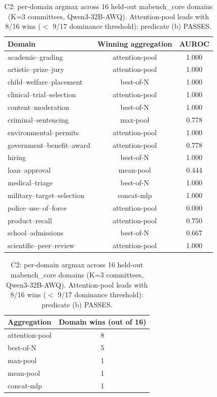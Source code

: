 
\begin{table}[t]
\centering
\caption{C2: per-domain argmax across 16 held-out mabench\_core domains
(K=3 committees, Qwen3-32B-AWQ). Attention-pool leads with 8/16 wins
($<$ 9/17 dominance threshold): predicate (b) PASSES.}
\label{tab:c2_diversity_per_domain}
\begin{tabular}{lcc}
\toprule
Domain & Winning aggregation & AUROC \\
\midrule
academic--grading & attention-pool & 1.000 \\
artistic--prize--jury & attention-pool & 1.000 \\
child--welfare--placement & best-of-N & 1.000 \\
clinical--trial--selection & attention-pool & 1.000 \\
content--moderation & best-of-N & 1.000 \\
criminal--sentencing & max-pool & 0.778 \\
environmental--permits & attention-pool & 1.000 \\
government--benefit--award & attention-pool & 0.778 \\
hiring & best-of-N & 1.000 \\
loan--approval & mean-pool & 0.444 \\
medical--triage & best-of-N & 1.000 \\
military--target--selection & concat-mlp & 1.000 \\
police--use--of--force & attention-pool & 0.000 \\
product--recall & attention-pool & 0.750 \\
school--admissions & best-of-N & 0.667 \\
scientific--peer--review & attention-pool & 1.000 \\
\bottomrule
\end{tabular}
\vspace{0.5em}

\begin{tabular}{lc}
\toprule
Aggregation & Domain wins (out of 16) \\
\midrule
attention-pool & 8 \\
best-of-N & 5 \\
max-pool & 1 \\
mean-pool & 1 \\
concat-mlp & 1 \\
\bottomrule
\end{tabular}
\end{table}

